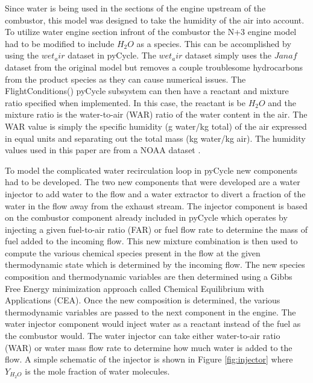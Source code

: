 \documentclass[conf]{new-aiaa}
\begin{document}
Since water is being used in the sections of the engine upstream of the combustor, this model was designed to take the humidity of the air into account.
To utilize water engine section infront of the combustor the N+3 engine model had to be modified to include $H_2O$ as a species.
This can be accomplished by using the $wet_air$ dataset in pyCycle.
The $wet_air$ dataset simply uses the $Janaf$ dataset from the original model but removes a couple troublesome hydrocarbons from the product species as they can cause numerical issues.
The FlightConditions() pyCycle subsystem can then have a reactant and mixture ratio specified when implemented.
In this case, the reactant is be $H_2O$ and the mixture ratio is the water-to-air (WAR) ratio of the water content in the air.
The WAR value is simply the specific humidity (g water/kg total) of the air expressed in equal units and separating out the total mass (kg water/kg air).
The humidity values used in this paper are from a NOAA dataset \cite{Kalnay1996}.

To model the complicated water recirculation loop in pyCycle new components had to be developed.
The two new components that were developed are a water injector to add water to the flow and a water extractor to divert a fraction of the water in the flow away from the exhaust stream.
The injector component is based on the combustor component already included in pyCycle which operates by injecting a given fuel-to-air ratio (FAR) or fuel flow rate to determine the mass of fuel added to the incoming flow.
This new mixture combination is then used to compute the various chemical species present in the flow at the given thermodynamic state which is determined by the incoming flow.
The new species composition and thermodynamic variables are then determined using a Gibbs Free Energy minimization approach called Chemical Equilibrium with Applications (CEA).
Once the new composition is determined, the various thermodynamic variables are passed to the next component in the engine.
The water injector component would inject water as a reactant instead of the fuel as the combustor would.
The water injector can take either water-to-air ratio (WAR) or water mass flow rate to determine how much water is added to the flow.
A simple schematic of the injector is shown in Figure \ref{fig:injector} where $Y_{H_2O}$ is the mole fraction of water molecules.
\end{document}
